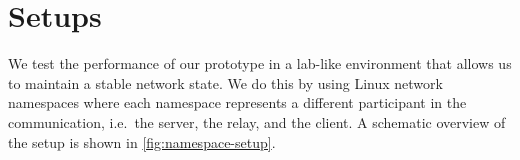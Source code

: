 \section{Setups}\label{sec:setups}

We test the performance of our prototype in a lab-like environment that 
allows us to maintain a stable network state.
We do this by using Linux network namespaces where each namespace represents
a different participant in the communication, i.e.~the server, the relay, and the client.
A schematic overview of the setup is shown in \autoref{fig:namespace-setup}.

        
        

